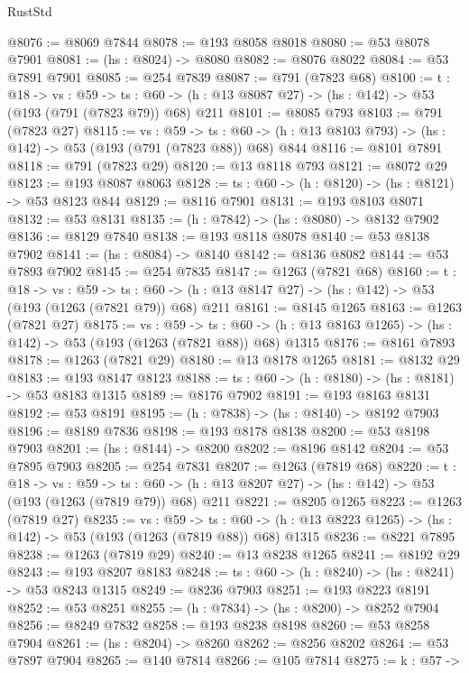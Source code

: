 \begin{lexlean}{RustStd}
\begin{coremodule}
@8076 := @8069 @7844
@8078 := @193 @8058 @8018
@8080 := @53 @8078 @7901
@8081 := (hs : @8024) -> @8080
@8082 := @8076 @8022
@8084 := @53 @7891 @7901
@8085 := @254 @7839
@8087 := @791 (@7823 @68)
@8100 := {t : @18} ->
  {vs : @59} ->
  {ts : @60} -> (h : @13 @8087 @27) -> (hs : @142) -> @53 (@193 (@791 (@7823 @79)) @68) @211
@8101 := @8085 @793
@8103 := @791 (@7823 @27)
@8115 := {vs : @59} ->
  {ts : @60} -> (h : @13 @8103 @793) -> (hs : @142) -> @53 (@193 (@791 (@7823 @88)) @68) @844
@8116 := @8101 @7891
@8118 := @791 (@7823 @29)
@8120 := @13 @8118 @793
@8121 := @8072 @29
@8123 := @193 @8087 @8063
@8128 := {ts : @60} -> (h : @8120) -> (hs : @8121) -> @53 @8123 @844
@8129 := @8116 @7901
@8131 := @193 @8103 @8071
@8132 := @53 @8131
@8135 := (h : @7842) -> (hs : @8080) -> @8132 @7902
@8136 := @8129 @7840
@8138 := @193 @8118 @8078
@8140 := @53 @8138 @7902
@8141 := (hs : @8084) -> @8140
@8142 := @8136 @8082
@8144 := @53 @7893 @7902
@8145 := @254 @7835
@8147 := @1263 (@7821 @68)
@8160 := {t : @18} ->
  {vs : @59} ->
  {ts : @60} -> (h : @13 @8147 @27) -> (hs : @142) -> @53 (@193 (@1263 (@7821 @79)) @68) @211
@8161 := @8145 @1265
@8163 := @1263 (@7821 @27)
@8175 := {vs : @59} ->
  {ts : @60} -> (h : @13 @8163 @1265) -> (hs : @142) -> @53 (@193 (@1263 (@7821 @88)) @68) @1315
@8176 := @8161 @7893
@8178 := @1263 (@7821 @29)
@8180 := @13 @8178 @1265
@8181 := @8132 @29
@8183 := @193 @8147 @8123
@8188 := {ts : @60} -> (h : @8180) -> (hs : @8181) -> @53 @8183 @1315
@8189 := @8176 @7902
@8191 := @193 @8163 @8131
@8192 := @53 @8191
@8195 := (h : @7838) -> (hs : @8140) -> @8192 @7903
@8196 := @8189 @7836
@8198 := @193 @8178 @8138
@8200 := @53 @8198 @7903
@8201 := (hs : @8144) -> @8200
@8202 := @8196 @8142
@8204 := @53 @7895 @7903
@8205 := @254 @7831
@8207 := @1263 (@7819 @68)
@8220 := {t : @18} ->
  {vs : @59} ->
  {ts : @60} -> (h : @13 @8207 @27) -> (hs : @142) -> @53 (@193 (@1263 (@7819 @79)) @68) @211
@8221 := @8205 @1265
@8223 := @1263 (@7819 @27)
@8235 := {vs : @59} ->
  {ts : @60} -> (h : @13 @8223 @1265) -> (hs : @142) -> @53 (@193 (@1263 (@7819 @88)) @68) @1315
@8236 := @8221 @7895
@8238 := @1263 (@7819 @29)
@8240 := @13 @8238 @1265
@8241 := @8192 @29
@8243 := @193 @8207 @8183
@8248 := {ts : @60} -> (h : @8240) -> (hs : @8241) -> @53 @8243 @1315
@8249 := @8236 @7903
@8251 := @193 @8223 @8191
@8252 := @53 @8251
@8255 := (h : @7834) -> (hs : @8200) -> @8252 @7904
@8256 := @8249 @7832
@8258 := @193 @8238 @8198
@8260 := @53 @8258 @7904
@8261 := (hs : @8204) -> @8260
@8262 := @8256 @8202
@8264 := @53 @7897 @7904
@8265 := @140 @7814
@8266 := @105 @7814
@8275 := {k : @57} ->

\end{coremodule}
\end{lexlean}

